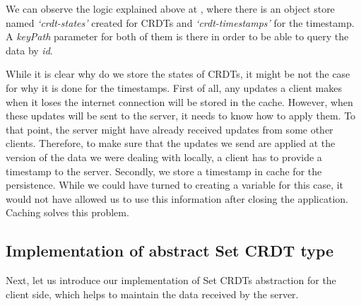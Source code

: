 We can observe the logic explained above at , where there is an object store named \textit{`crdt-states'} created for CRDTs and \textit{`crdt-timestamps'} for the timestamp. A \textit{keyPath} parameter for both of them is there in order to be able to query the data by \textit{id}. 

While it is clear why do we store the states of CRDTs, it might be not the case for why it is done for the timestamps. First of all, any updates a client makes when it loses the internet connection will be stored in the cache. However, when these updates will be sent to the server, it needs to know how to apply them. To that point, the server might have already received updates from some other clients. Therefore, to make sure that the updates we send are applied at the version of the data we were dealing with locally, a client has to provide a timestamp to the server. Secondly, we store a timestamp in cache for the persistence. While we could have turned to creating a variable for this case, it would not have allowed us to use this information after closing the application. Caching solves this problem.

\subsection*{Implementation of abstract Set CRDT type}

Next, let us introduce our implementation of Set CRDTs abstraction for the client side, which helps to maintain the data received by the server.

